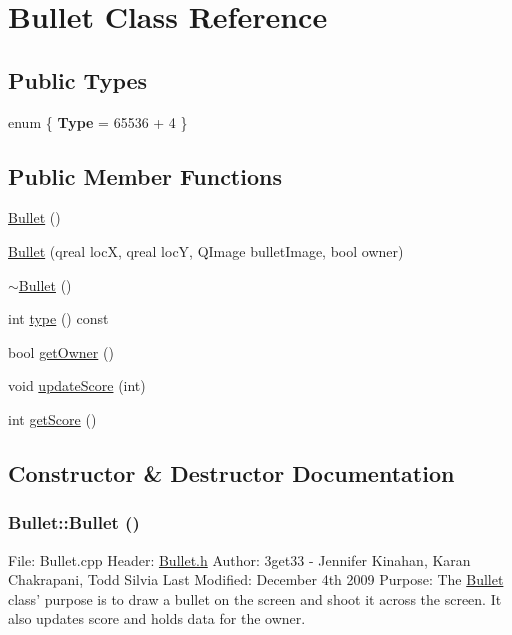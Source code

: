 \hypertarget{class_bullet}{
\section{Bullet Class Reference}
\label{class_bullet}
}
\subsection*{Public Types}
\begin{DoxyCompactItemize}
\item 
enum \{ {\bfseries Type} =  65536 + 4
 \}
\end{DoxyCompactItemize}
\subsection*{Public Member Functions}
\begin{DoxyCompactItemize}
\item 
\hyperlink{class_bullet_acd7befc0bc18907cc1d871d37bbdddeb}{Bullet} ()
\item 
\hyperlink{class_bullet_ae5ffe28b85e0c71327b1d400f3b065a3}{Bullet} (qreal locX, qreal locY, QImage bulletImage, bool owner)
\item 
\hyperlink{class_bullet_aaeb5cb41d7db89f49007b08b41f1bfcf}{$\sim$Bullet} ()
\item 
int \hyperlink{class_bullet_a2c7acaad02de31fa4d0e4c837a05be4f}{type} () const 
\item 
bool \hyperlink{class_bullet_ab2959056bba728b7f0a84b15aca1bee3}{getOwner} ()
\item 
void \hyperlink{class_bullet_a6a304710eaa8ea9337c27e827a0f2400}{updateScore} (int)
\item 
int \hyperlink{class_bullet_adf5073e03d5eb9ce5cbf2af3653d02ef}{getScore} ()
\end{DoxyCompactItemize}


\subsection{Constructor \& Destructor Documentation}
\hypertarget{class_bullet_acd7befc0bc18907cc1d871d37bbdddeb}{
\subsubsection[{Bullet}]{\setlength{\rightskip}{0pt plus 5cm}Bullet::Bullet ()}}
\label{class_bullet_acd7befc0bc18907cc1d871d37bbdddeb}
File: Bullet.cpp Header: \hyperlink{_bullet_8h_source}{Bullet.h} Author: 3get33 -\/ Jennifer Kinahan, Karan Chakrapani, Todd Silvia Last Modified: December 4th 2009 Purpose: The \hyperlink{class_bullet}{Bullet} class' purpose is to draw a bullet on the screen and shoot it across the screen. It also updates score and holds data for the owner.

